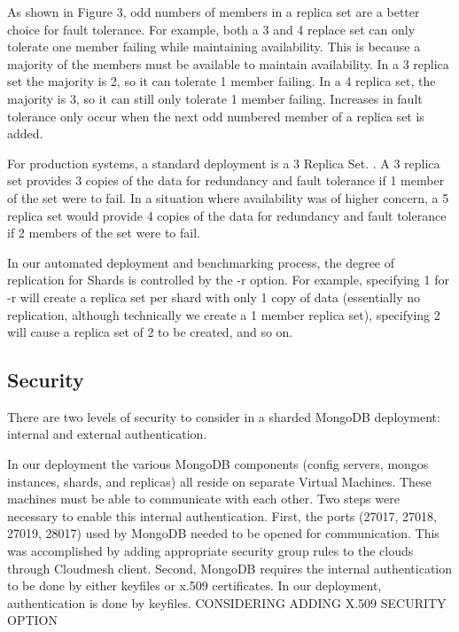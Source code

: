 \documentclass[9pt,twocolumn,twoside]{../../styles/osajnl}
\begin{document}
As shown in Figure 3, odd numbers of members in a replica set are a better choice for fault tolerance. For example, both a 3 and 4 replace set can only tolerate one member failing while maintaining availability.  This is because a majority of the members must be available to maintain availability.  In a 3 replica set the majority is 2, so it can tolerate 1 member failing.  In a 4 replica set, the majority is 3, so it can still only tolerate 1 member failing.  Increases in fault tolerance only occur when the next odd numbered member of a replica set is added.  \cite{www-mongoRepDep}

For production systems, a standard deployment is a 3 Replica Set.  \cite{www-mongoRepDep}.  A 3 replica set provides 3 copies of the data for redundancy and fault tolerance if 1 member of the set were to fail.  In a situation where availability was of higher concern, a 5 replica set would provide 4 copies of the data for redundancy and fault tolerance if 2 members of the set were to fail.

In our automated deployment and benchmarking process, the degree of replication for Shards is controlled by the -r option. For example, specifying 1 for -r will create a replica set per shard with only 1 copy of data (essentially no replication, although technically we create a 1 member replica set), specifying 2 will cause a replica set of 2 to be created, and so on.

\subsection{Security}

There are two levels of security to consider in a sharded MongoDB deployment: internal and external authentication.

In our deployment the various MongoDB components (config servers, mongos instances, shards, and replicas) all reside on separate Virtual Machines.  These machines must be able to communicate with each other.  Two steps were necessary to enable this internal authentication.  First, the ports (27017, 27018, 27019, 28017) used by MongoDB needed to be opened for communication.  This was accomplished by adding appropriate security group rules to the clouds through Cloudmesh client.  Second, MongoDB requires the internal authentication to be done by either keyfiles or x.509 certificates.  \cite{www-mongoAuth}  In our deployment, authentication is done by keyfiles. CONSIDERING ADDING X.509 SECURITY OPTION
\end{document}
